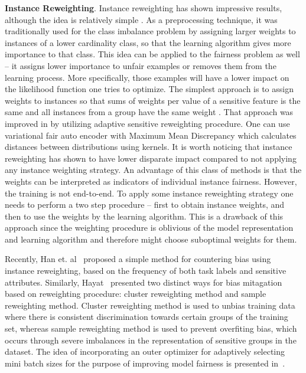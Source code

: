 \documentclass[preprint,12pt]{elsarticle}
\begin{document}
\textbf{Instance Reweighting}. Instance reweighting has shown impressive results, although the idea is relatively simple \cite{feldman2015certifying, krasanakis2018adaptive, ren2018learning, shu2019meta, jiang2018mentornet}. As a preprocessing technique, it was traditionally used for the class imbalance problem by assigning larger weights to instances of a  lower cardinality class, so that the learning algorithm gives more importance to that class. This idea can be applied to the fairness problem as well -- it assigns lower importance to unfair examples or removes them from the learning process. More specifically, those examples will have a lower impact on the likelihood function one tries to optimize.
The simplest approach is to assign weights to instances so that sums of weights per value of a  sensitive feature is the same and all instances from a group have the same weight \cite{kamiran2012data}. That approach was improved in \cite{krasanakis2018adaptive} by utilizing adaptive sensitive reweighting procedure. One can use variational fair auto encoder with Maximum Mean Discrepancy \cite{louizos2015variational} which calculates distances between distributions using kernels. It is worth noticing that instance reweighting has shown to have lower disparate impact \cite{feldman2015certifying} compared to not applying any instance weighting strategy. An advantage of this class of methods is that the weights can be interpreted as indicators of individual instance fairness. However, the training is not end-to-end. To apply some instance reweighting strategy one needs to perform a two step procedure -- first to obtain instance weights, and then to use the weights by the learning algorithm. This is a drawback of this approach since the weighting procedure is oblivious of the model representation and learning algorithm and therefore might choose suboptimal weights for them. 

Recently, Han et. al~\cite{han2021balancing} proposed a simple method for countering bias using instance reweighting, based on the frequency of both task labels and sensitive attributes. Similarly, Hayat~\cite{hayat2021towards} presented two distinct ways for bias mitagation based on reweighting procedure: cluster reweighting method and sample reweighting method. Cluster reweighting method is used to unbias training data where there is consistent discrimination towards certain groups of the training set, whereas sample reweighting method is used to prevent overfiting bias, which occurs through severe imbalances in
the representation of sensitive groups in the dataset. The idea of incorporating an outer optimizer for adaptively selecting mini batch sizes for the purpose of improving model fairness is presented in~\cite{roh2020fairbatch}.
\end{document}
